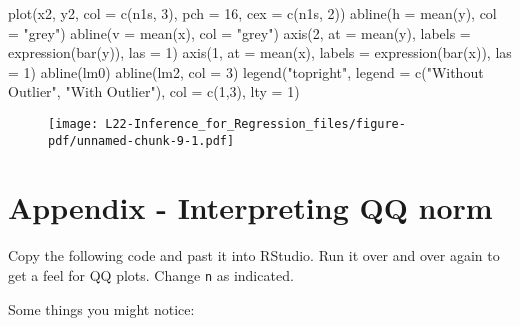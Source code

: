 \documentclass[
  letterpaper,
  DIV=11,
  numbers=noendperiod]{scrreprt}
\newenvironment{Shaded}{\begin{snugshade}}{\end{snugshade}}
\newcommand{\AttributeTok}[1]{\textcolor[rgb]{0.40,0.45,0.13}{#1}}
\newcommand{\DecValTok}[1]{\textcolor[rgb]{0.68,0.00,0.00}{#1}}
\newcommand{\FunctionTok}[1]{\textcolor[rgb]{0.28,0.35,0.67}{#1}}
\newcommand{\NormalTok}[1]{\textcolor[rgb]{0.00,0.23,0.31}{#1}}
\newcommand{\StringTok}[1]{\textcolor[rgb]{0.13,0.47,0.30}{#1}}
\begin{document}
\begin{Shaded}
\begin{Highlighting}[]
\FunctionTok{plot}\NormalTok{(x2, y2, }\AttributeTok{col =} \FunctionTok{c}\NormalTok{(n1s, }\DecValTok{3}\NormalTok{), }
    \AttributeTok{pch =} \DecValTok{16}\NormalTok{, }\AttributeTok{cex =} \FunctionTok{c}\NormalTok{(n1s, }\DecValTok{2}\NormalTok{))}
\FunctionTok{abline}\NormalTok{(}\AttributeTok{h =} \FunctionTok{mean}\NormalTok{(y), }\AttributeTok{col =} \StringTok{"grey"}\NormalTok{)}
\FunctionTok{abline}\NormalTok{(}\AttributeTok{v =} \FunctionTok{mean}\NormalTok{(x), }\AttributeTok{col =} \StringTok{"grey"}\NormalTok{)}
\FunctionTok{axis}\NormalTok{(}\DecValTok{2}\NormalTok{, }\AttributeTok{at =} \FunctionTok{mean}\NormalTok{(y), }\AttributeTok{labels =} \FunctionTok{expression}\NormalTok{(}\FunctionTok{bar}\NormalTok{(y)), }\AttributeTok{las =} \DecValTok{1}\NormalTok{)}
\FunctionTok{axis}\NormalTok{(}\DecValTok{1}\NormalTok{, }\AttributeTok{at =} \FunctionTok{mean}\NormalTok{(x), }\AttributeTok{labels =} \FunctionTok{expression}\NormalTok{(}\FunctionTok{bar}\NormalTok{(x)), }\AttributeTok{las =} \DecValTok{1}\NormalTok{)}
\FunctionTok{abline}\NormalTok{(lm0)}
\FunctionTok{abline}\NormalTok{(lm2, }\AttributeTok{col =} \DecValTok{3}\NormalTok{)}
\FunctionTok{legend}\NormalTok{(}\StringTok{"topright"}\NormalTok{, }\AttributeTok{legend =} \FunctionTok{c}\NormalTok{(}\StringTok{"Without Outlier"}\NormalTok{, }\StringTok{"With Outlier"}\NormalTok{), }\AttributeTok{col =} \FunctionTok{c}\NormalTok{(}\DecValTok{1}\NormalTok{,}\DecValTok{3}\NormalTok{), }\AttributeTok{lty =} \DecValTok{1}\NormalTok{)}
\end{Highlighting}
\end{Shaded}

\begin{figure}[H]

{\centering \texttt{[image: L22-Inference\_for\_Regression\_files/figure-pdf/unnamed-chunk-9-1.pdf]}

}

\end{figure}

\hypertarget{appendix---interpreting-qq-norm}{%
\section{Appendix - Interpreting QQ
norm}\label{appendix---interpreting-qq-norm}}

Copy the following code and past it into RStudio. Run it over and over
again to get a feel for QQ plots. Change \texttt{n} as indicated.

Some things you might notice:
\end{document}
